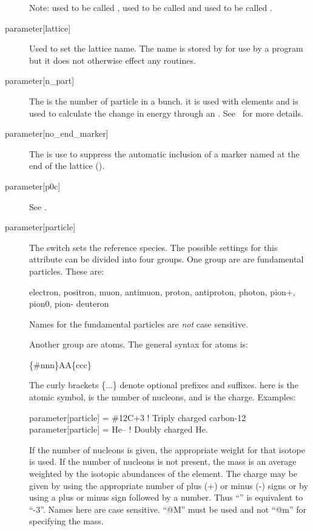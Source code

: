 \begin{description}
Note:  used to be called , 
used to be called  and  used to be
called .
  \item[{parameter[lattice]}] \Newline
Used to set the lattice name. The  name is stored by \bmad
for use by a program but it does not otherwise effect any \bmad
routines.
  \item[{parameter[n_part]}] \Newline
The  is the number of particle in a bunch.
it is used with  elements and is used to calculate the
change in energy through an . See~ for more
details.
  \item[{parameter[no_end_marker]}] \Newline
The  is use to suppress the automatic inclusion
of a marker named  at the end of the lattice (). 
  \item[{parameter[p0c]}] \Newline
See .
  \item[{parameter[particle]}] \Newline
The  switch sets the reference species. The possible settings for
this attribute can be divided into four groups. One group are are fundamental
particles. These are:
\begin{example}
  electron,  positron,
  muon,      antimuon,
  proton,    antiproton,
  photon, 
  pion+,      pion0,      pion-
  deuteron
\end{example}
Names for the fundamental particles are {\em not} case sensitive.

Another group are atoms. The general syntax for atoms is:
\begin{example}
  \{\#nnn\}AA\{ccc\}
\end{example}
The curly brackets \{...\} denote optional prefixes and suffixes.  here is the
atomic symbol,  is the number of nucleons, and  is the charge. Examples:
\begin{example}
  parameter[particle] = \#12C+3       ! Triply charged carbon-12
  parameter[particle] = He--          ! Doubly charged He.
\end{example}
If the number of nucleons is given, the appropriate weight for that isotope is used. If
the number of nucleons is not present, the mass is an average weighted by the isotopic
abundances of the element. The charge may be given by using the appropriate number of plus
(+) or minus (-) signs or by using a plus or minus sign followed by a number. Thus
``\vn{-{-}-}'' is equivalent to ``-3''. Names here are case sensitive. ``@M'' must be used
and not ``@m'' for specifying the mass.


\end{description}
